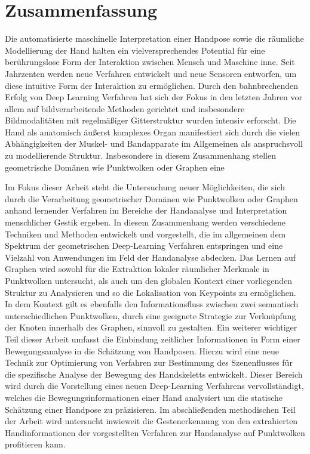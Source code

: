 \documentclass[
  11pt,
  a4paper,
  twoside,
  headsepline,
  titlepage,
  parskip=off
  DIV=11,
  BCOR=12mm,
  captions=tableheading,
  chapterprefix=on,
  numbers=noenddot
]{scrbook}
\begin{document}
\chapter*{Zusammenfassung}
Die automatisierte maschinelle Interpretation einer Handpose sowie die räumliche Modellierung der Hand halten ein vielversprechendes Potential für eine berührungslose Form der Interaktion zwischen Mensch und Maschine inne. Seit Jahrzenten werden neue Verfahren entwickelt und neue Sensoren entworfen, um diese intuitive Form der Interaktion zu ermöglichen. Durch den bahnbrechenden Erfolg von Deep Learning Verfahren hat sich der Fokus in den letzten Jahren vor allem auf bildverarbeitende Methoden gerichtet und insbesondere Bildmodalitäten mit regelmäßiger Gitterstruktur wurden intensiv erforscht. Die Hand als anatomisch äußerst komplexes Organ manifestiert sich durch die vielen Abhängigkeiten der Muskel- und Bandapparate im Allgemeinen als anspruchsvoll zu modellierende Struktur. Insbesondere in diesem Zusammenhang stellen geometrische Domänen wie Punktwolken oder Graphen eine

Im Fokus dieser Arbeit steht die Untersuchung neuer Möglichkeiten, die sich durch die Verarbeitung geometrischer Domänen wie Punktwolken oder Graphen anhand lernender Verfahren im Bereiche der Handanalyse und Interpretation menschlicher Gestik ergeben. In diesem Zusammenhang werden verschiedene Techniken und Methoden entwickelt und vorgestellt, die im allgemeinen dem Spektrum der geometrischen Deep-Learning Verfahren entspringen und eine Vielzahl von Anwendungen im Feld der Handanalyse abdecken.
Das Lernen auf Graphen wird sowohl für die Extraktion lokaler räumlicher Merkmale in Punktwolken untersucht, als auch um den globalen Kontext einer vorliegenden Struktur zu Analysieren und so die Lokalisation von Keypoints zu ermöglichen. In dem Kontext gilt es ebenfalls den Informationsfluss zwischen zwei semantisch unterschiedlichen Punktwolken, durch eine geeignete Strategie zur Verknüpfung der Knoten innerhalb des Graphen, sinnvoll zu gestalten.
Ein weiterer wichtiger Teil dieser Arbeit umfasst die Einbindung zeitlicher Informationen in Form einer Bewegungsanalyse in die Schätzung von Handposen. Hierzu wird eine neue Technik zur Optimierung von Verfahren zur Bestimmung des Szenenflusses für die spezifische Analyse der Bewegung des Handskeletts entwickelt. Dieser Bereich wird durch die Vorstellung eines neuen Deep-Learning Verfahrens vervollständigt, welches die Bewegungsinformationen einer Hand analysiert um die statische Schätzung einer Handpose zu präzisieren.
Im abschließenden methodischen Teil der Arbeit wird untersucht inwieweit die Gestenerkennung von den extrahierten Handinformationen der vorgestellten Verfahren zur Handanalyse auf Punktwolken profitieren kann.
\end{document}
